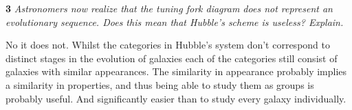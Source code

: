 \documentclass[11pt,a4paper]{article}
\begin{document}
    \textbf{3} \textit{Astronomers now realize that the tuning fork diagram does not represent an evolutionary sequence.  Does this mean that Hubble’s scheme is useless?  Explain.}

    No it does not.
    Whilst the categories in Hubble's system don't correspond to distinct stages in the evolution of galaxies each of the categories still consist of galaxies with similar appearances.
    The similarity in appearance probably implies a similarity in properties, and thus being able to study them as groups is probably useful.
    And significantly easier than to study every galaxy individually.
\end{document}
